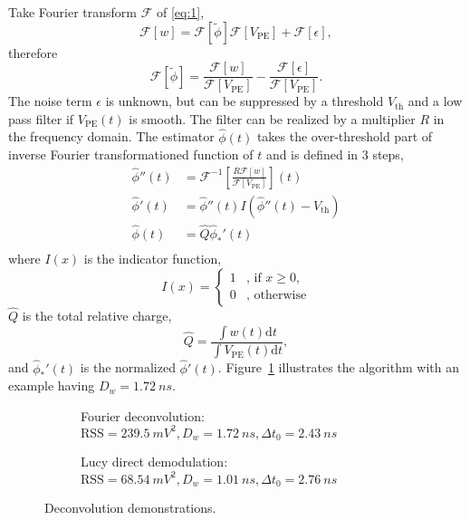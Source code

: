 Take Fourier transform $\mathcal{F}$ of \eqref{eq:1},
\begin{equation}
  \label{eq:fourier}
  \mathcal{F}[w] = \mathcal{F}[\tilde{\phi}]\mathcal{F}[V_\mathrm{PE}] + \mathcal{F}[\epsilon],
\end{equation}
therefore
\begin{equation}
  \label{eq:fdconv}
  \mathcal{F}[\tilde{\phi}] = \frac{\mathcal{F}[w]}{\mathcal{F}[V_\mathrm{PE}]} - \frac{\mathcal{F}[\epsilon]}{\mathcal{F}[V_\mathrm{PE}]}.
\end{equation}
The noise term $\epsilon$ is unknown, but can be suppressed by a threshold $V_\mathrm{th}$ and a low pass filter if $V_\mathrm{PE}(t)$ is smooth.  The filter can be realized by a multiplier $R$ in the frequency domain. The estimator $\hat{\phi}(t)$ takes the over-threshold part of inverse Fourier transformationed function of $t$ and is defined in 3 steps,
\begin{equation}
  \label{eq:fdconv2}
  \begin{aligned}
    \hat{\phi}''(t) & = \mathcal{F}^{-1}\left[\frac{R \mathcal{F}[w]}{\mathcal{F}[V_\mathrm{PE}]}\right](t) \\
    \hat{\phi}'(t) & = \hat{\phi}''(t) I(\hat{\phi}''(t) - V_\mathrm{th}) \\
    \hat{\phi}(t) & = \hat{Q}\hat{\phi}_*'(t) \\
  \end{aligned}
\end{equation}
where $I(x)$ is the indicator function,
\begin{equation}
  \label{eq:id}
  I(x) = \left\{
    \begin{array}{ll}
      1 & \mbox{, if $x\ge0$}, \\
      0 & \mbox{, otherwise}
    \end{array}
    \right.
\end{equation}
$\hat{Q}$ is the total relative charge,
\begin{equation}
  \label{eq:Q}
  \hat{Q} = \frac{\int w(t) \mathrm{d}t}{\int V_\mathrm{PE}(t) \mathrm{d}t},
\end{equation}
and $\hat{\phi}_*'(t)$ is the normalized $\hat{\phi}'(t)$. Figure~\ref{fig:fd} illustrates the algorithm with an example having $D_w = \SI{1.72}{ns}$. 

\begin{figure}[H]
  \begin{subfigure}{0.5\textwidth}
    \centering
    \scalebox{0.36}{}
    \caption{\label{fig:fd}Fourier deconvolution: $\mathrm{RSS}=\SI{239.5}{mV^2},D_w=\SI{1.72}{ns},\Delta t_0=\SI{2.43}{ns}$}
  \end{subfigure}
  \begin{subfigure}{0.5\textwidth}
    \centering
    \scalebox{0.36}{}
    \caption{\label{fig:lucy}Lucy direct demodulation: $\mathrm{RSS}=\SI{68.54}{mV^2},D_w=\SI{1.01}{ns},\Delta t_0=\SI{2.76}{ns}$}
  \end{subfigure}
  \caption{Deconvolution demonstrations.}
\end{figure}


